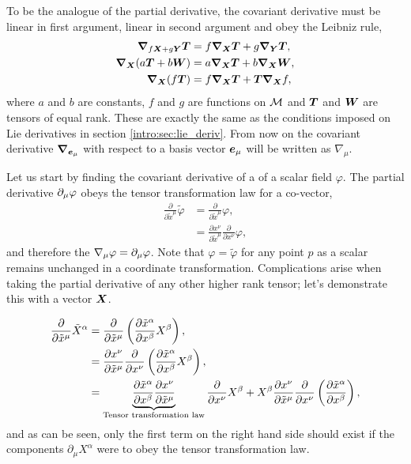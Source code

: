 To be the analogue of the partial derivative, the covariant derivative must be linear in first argument, linear in second argument and obey the Leibniz rule,
\begin{align}
\label{intro:eq:cov-lin}\boldsymbol{\nabla}_{f\boldsymbol{X} + g\boldsymbol{Y}}\boldsymbol{T} &= f\boldsymbol{\nabla}_{\boldsymbol{X}}\boldsymbol{T} + g\boldsymbol{\nabla}_{\boldsymbol{Y}}\boldsymbol{T} , \\
\label{intro:eq:cov-ass}\boldsymbol{\nabla}_{\boldsymbol{X}}( a\boldsymbol{T} + b\boldsymbol{W}) &= a\boldsymbol{\nabla}_{\boldsymbol{X}}\boldsymbol{T} + b\boldsymbol{\nabla}_{\boldsymbol{X}}\boldsymbol{W} , \\
\label{intro:eq:cov-pro}\boldsymbol{\nabla}_{\boldsymbol{X}}( f\boldsymbol{T}) &= f\boldsymbol{\nabla}_{\boldsymbol{X}}\boldsymbol{T} + \boldsymbol{T} \boldsymbol{\nabla}_{\boldsymbol{X}}f ,
\end{align}
where $a$ and $b$ are constants, $f$ and $g$ are functions on $\mathcal{M}$ and $\boldsymbol{T}$ and $\boldsymbol{W}$ are tensors of equal rank. These are exactly the same as the conditions imposed on Lie derivatives in section \ref{intro:sec:lie_deriv}. From now on the covariant derivative $\boldsymbol{\nabla}_{\boldsymbol{e}_\mu}$ with respect to a basis vector $\boldsymbol{e}_\mu$ will be written as $\nabla_\mu$.

Let us start by finding the covariant derivative of a of a scalar field $\varphi$. The partial derivative $\partial_\mu \varphi$ obeys the tensor transformation law for a co-vector,
\begin{align}
\frac{\partial}{\partial \tilde{x}^\mu} \tilde{\varphi} &=\frac{\partial}{\partial \tilde{x}^\mu} {\varphi} ,\\
                                                        &=\frac{\partial x^\nu}{\partial\tilde{x}^\mu}\frac{\partial}{\partial {x}^\nu} {\varphi},
\end{align}
and therefore the $\nabla_\mu \varphi = \partial_\mu \varphi$. Note that $\varphi=\tilde{\varphi}$ for any point $p$ as a scalar remains unchanged in a coordinate transformation. Complications arise when taking the partial derivative of any other higher rank tensor; let's demonstrate this with a vector $\boldsymbol{X}$.


\begin{align}
\frac{\partial}{\partial \tilde{x}^\mu} \tilde{X}^\alpha &= \frac{\partial}{\partial \tilde{x}^\mu}\left( \frac{\partial \tilde{x}^\alpha}{\partial x^\beta}{X}^\beta\right),\\
                                                         &= \frac{\partial x^\nu}{\partial \tilde{x}^\mu}\frac{\partial}{\partial {x}^\nu}\left( \frac{\partial \tilde{x}^\alpha}{\partial x^\beta}{X}^\beta\right),\\
                                                         &= \underbrace{\frac{\partial \tilde{x}^\alpha}{\partial x^\beta}\frac{\partial x^\nu}{\partial \tilde{x}^\mu}}_{\mathrm{Tensor}\,\,\rm{transformation}\,\,\rm{law}}\frac{\partial}{\partial {x}^\nu} {X}^\beta + {X}^\beta\frac{\partial x^\nu}{\partial \tilde{x}^\mu}\frac{\partial}{\partial {x}^\nu}\left( \frac{\partial \tilde{x}^\alpha}{\partial x^\beta}\right),
\end{align}
and as can be seen, only the first term on the right hand side should exist if the components $\partial_\mu X^\alpha$ were to obey the tensor transformation law.

